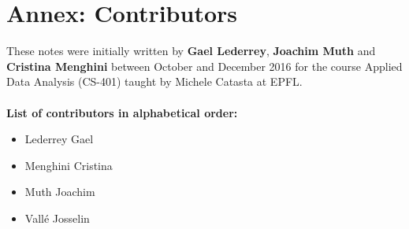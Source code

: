 

\section{Annex: Contributors}

These notes were initially written by \textbf{Gael Lederrey}, \textbf{Joachim Muth} and \textbf{Cristina Menghini} between October and December 2016 for the course Applied Data Analysis (CS-401) taught by Michele Catasta at EPFL.
\\ \\
\textbf{List of contributors in alphabetical order:}
\begin{itemize}
	\item Lederrey Gael
	\item Menghini Cristina
	\item Muth Joachim
	\item Vall\'e Josselin
\end{itemize}












